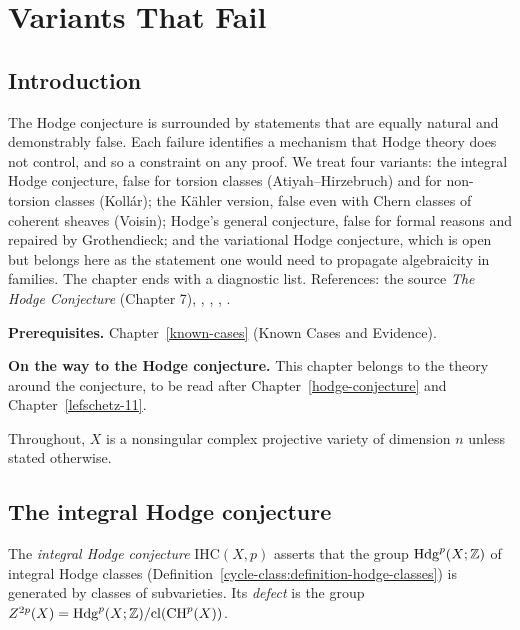 \chapter{Variants That Fail}\label{failures}

\section{Introduction}\label{failures:section-introduction}

The Hodge conjecture is surrounded by statements that are equally natural and demonstrably false. Each failure identifies a mechanism that Hodge theory does not
control, and so a constraint on any proof. We treat four variants: the integral Hodge conjecture, false for torsion classes (Atiyah--Hirzebruch) and for non-torsion classes
(Koll\'ar); the K\"ahler version, false even with Chern classes of coherent sheaves (Voisin); Hodge's general conjecture, false for formal reasons and repaired by Grothendieck;
and the variational Hodge conjecture, which is open but belongs here as the statement one would need to propagate algebraicity in families. The chapter ends with a diagnostic list.
References: the source \emph{The Hodge Conjecture} (Chapter 7), \cite{atiyah-hirzebruch-1962}, \cite{kollar-1992}, \cite{voisin-2002}, \cite{grothendieck-1969}.

\noindent\textbf{Prerequisites.} Chapter~\ref{known-cases} (Known Cases and Evidence).

\noindent\textbf{On the way to the Hodge conjecture.} This chapter belongs to the theory around the conjecture, to be read after Chapter~\ref{hodge-conjecture} and Chapter~\ref{lefschetz-11}.

Throughout, $X$ is a nonsingular complex projective variety of dimension $n$ unless stated otherwise.

\section{The integral Hodge conjecture}\label{failures:section-integral}

\begin{definition}\label{failures:definition-defect}
The \emph{integral Hodge conjecture} $\mathrm{IHC}(X, p)$ asserts that the group $\mathrm{Hdg}^p(X; \mathbb{Z})$ of integral Hodge classes (Definition~\ref{cycle-class:definition-hodge-classes}) is generated by
classes of subvarieties. Its \emph{defect} is the group $Z^{2p}(X) = \mathrm{Hdg}^p(X; \mathbb{Z})/\mathrm{cl}(\operatorname{CH}^p(X))$.
\end{definition}

